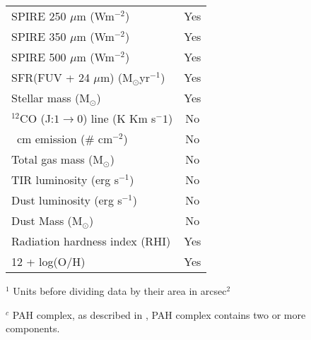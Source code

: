 \begin{table}
\begin{tabular}{ |l|c| }
SPIRE 250 $\mu$m (Wm$^{-2}$)& Yes\\
SPIRE 350 $\mu$m (Wm$^{-2}$)& Yes\\
SPIRE 500 $\mu$m (Wm$^{-2}$)& Yes\\
SFR(FUV + 24 $\mu$m) (M$_{\odot}$yr$^{-1}$) & Yes\\
Stellar mass (M$_{\odot}$)& Yes\\
$^{12}$CO (J:$1\rightarrow0$) line (K Km s$^-1$) & No \\
\hi 21~cm emission ($\#$ cm$^{-2}$) & No \\
Total gas mass (M$_{\odot}$) & No \\
TIR luminosity (erg s$^{-1}$) & No \\
Dust luminosity (erg s$^{-1}$) & No \\
Dust Mass (M$_{\odot}$)& No\\
Radiation hardness index (RHI) & Yes\\
12 + log(O/H)& Yes\\
\hline
\end{tabular}
\begin{tablenotes}
\item $^1$ Units before dividing data by their area in arcsec$^{2}$
\item $^c$ PAH complex, as described in \cite{Smith07a}, PAH complex contains two or more components.
\end{tablenotes}
\end{table}
